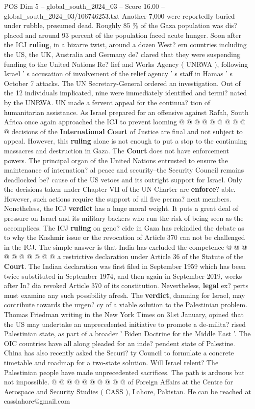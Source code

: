 \begin{textsample}{POS Dim 5 – global\_south\_2024\_03 – Score 16.00 – global\_south\_2024\_03/106746253.txt}
Another 7,000 were reportedly buried under rubble, presumed dead.
Roughly 85 \% of the Gaza population was dis? placed and around 93 percent of the population faced acute hunger.
Soon after the ICJ \textbf{ruling}, in a bizarre twist, around a dozen West? ern countries including the US, the UK, Australia and Germany de? clared that they were suspending funding to the United Nations Re? lief and Works Agency ( UNRWA ), following Israel ' s accusation of involvement of the relief agency ' s staff in Hamas ' s October 7 attacks.
The UN Secretary-General ordered an investigation.
Out of the 12 individuals implicated, nine were immediately identified and termi? nated by the UNRWA.
UN made a fervent appeal for the continua? tion of humanitarian assistance.
As Israel prepared for an offensive against Rafah, South Africa once again approached the ICJ to prevent looming @ @ @ @ @ @ @ @ @ @ decisions of the \textbf{International} \textbf{Court} of Justice are final and not subject to appeal.
However, this \textbf{ruling} alone is not enough to put a stop to the continuing massacres and destruction in Gaza.
The \textbf{Court} does not have enforcement powers.
The principal organ of the United Nations entrusted to ensure the maintenance of internation? al peace and security--the Security Council remains deadlocked be? cause of the US vetoes and its outright support for Israel.
Only the decisions taken under Chapter VII of the UN Charter are \textbf{enforce}? able.
However, such actions require the support of all five perma? nent members.
Nonetheless, the ICJ \textbf{verdict} has a huge moral weight.
It puts a great deal of pressure on Israel and its military backers who run the risk of being seen as the accomplices.
The ICJ \textbf{ruling} on geno? cide in Gaza has rekindled the debate as to why the Kashmir issue or the revocation of Article 370 can not be challenged in the ICJ.
The simple answer is that India has excluded the competence @ @ @ @ @ @ @ @ @ @ a restrictive declaration under Article 36 of the Statute of the \textbf{Court}.
The Indian declaration was first filed in September 1959 which has been twice substituted in September 1974, and then again in September 2019, weeks after In? dia revoked Article 370 of its constitution.
Nevertheless, \textbf{legal} ex? perts must examine any such possibility afresh.
The \textbf{verdict}, damning for Israel, may contribute towards the urgen? cy of a viable solution to the Palestinian problem.
Thomas Friedman writing in the New York Times on 31st January, opined that the US may undertake an unprecedented initiative to promote a de-milita? rised Palestinian state, as part of a broader ' Biden Doctrine for the Middle East '.
The OIC countries have all along pleaded for an inde? pendent state of Palestine.
China has also recently asked the Securi? ty Council to formulate a concrete timetable and roadmap for a two-state solution.
Will Israel relent?
The Palestinian people have made unprecedented sacrifices.
The path is arduous but not impossible. @ @ @ @ @ @ @ @ @ @ of Foreign Affairs at the Centre for Aerospace and Security Studies ( CASS ), Lahore, Pakistan.
He can be reached at casslahore@gmail.com


\end{textsample}
